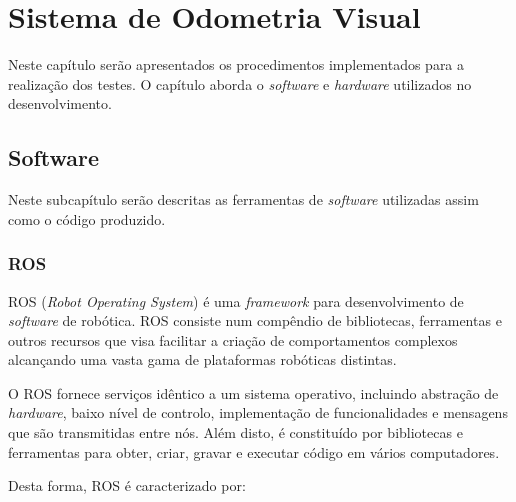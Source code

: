 \chapter{Sistema de Odometria Visual} \label{chap:sist}

Neste capítulo serão apresentados os procedimentos implementados para a realização dos testes. O capítulo aborda o \textit{software} e \textit{hardware} utilizados no desenvolvimento.

\section{Software}

Neste subcapítulo serão descritas as ferramentas de \textit{software} utilizadas assim como o código produzido.

\subsection{ROS}

ROS (\textit{Robot Operating System}) é uma \textit{framework} para desenvolvimento de \textit{software} de robótica. ROS consiste num compêndio de bibliotecas, ferramentas e outros recursos que visa facilitar a criação de comportamentos complexos alcançando uma vasta gama de plataformas robóticas distintas. 

O ROS fornece serviços idêntico a um sistema operativo, incluindo abstração de \textit{hardware}, baixo nível de controlo, implementação de funcionalidades e mensagens que são transmitidas entre nós. Além disto, é constituído por bibliotecas e ferramentas para obter, criar, gravar e executar código em vários computadores. 

Desta forma, ROS é caracterizado por:

